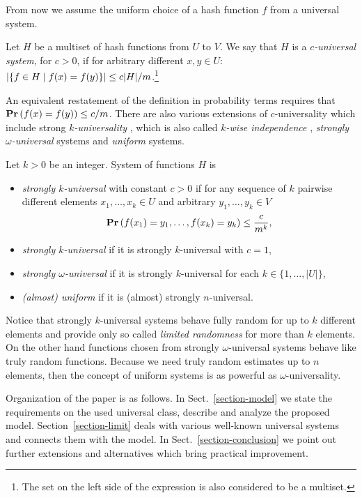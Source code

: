 From now we assume the uniform choice of a hash function $f$ from a universal system.

\begin{definition}
\label{definition-c-universal-system}
Let $H$ be a multiset of hash functions from $U$ to $V$. We say that $H$ is a \emph{$c$-universal system}, for $c > 0$, if for arbitrary different $x, y \in U$: $\left|\lbrace f \in H \mid f(x) = f(y) \rbrace\right| \leq {c|H|}/{m}$.\footnote{The set on the left side of the expression is also considered to be a multiset.}
\end{definition}

An equivalent restatement of the definition in probability terms requires that $\mathbf{Pr}\left(f(x) = f(y)\right) \leq c/m$. There are also various extensions of $c$-universality which include strong \emph{$k$-universality} \cite{DBLP:conf/focs/WegmanC79}, which is also called \emph{$k$-wise independence} \cite{DBLP:conf/focs/WegmanC79}, \emph{strongly $\omega$-universal} \cite{DBLP:conf/focs/WegmanC79} systems and \emph{uniform} \cite{DBLP:journals/siamcomp/PaghP08} systems.
\begin{definition}
Let $k > 0$ be an integer. System of functions $H$ is
\begin{itemize}
	\item \emph{strongly $k$-universal} with constant $c > 0$ if for any sequence of $k$ pairwise different elements $x_1, \dots, x_k \in U$ and arbitrary $y_1, \dots, y_k \in V$ \[\mathbf{Pr}\left(f(x_1) = y_1, \dots, f(x_k) = y_k\right) \leq \frac{c}{m^k}\mbox{,}\]
	\item \emph{strongly $k$-universal} if it is strongly $k$-universal with $c = 1$,
	\item \emph{strongly $\omega$-universal} if it is strongly $k$-universal for each $k \in \{1, \dots, |U|\}$,
	\item \emph{(almost) uniform} if it is (almost) strongly $n$-universal.
\end{itemize}
\end{definition}

Notice that strongly $k$-universal systems behave fully random for up to $k$ different elements and provide only so called \emph{limited randomness} for more than $k$ elements. On the other hand functions chosen from strongly $\omega$-universal systems behave like truly random functions. Because we need truly random estimates up to $n$ elements, then the concept of uniform systems is as powerful as $\omega$-universality.

Organization of the paper is as follows. In Sect.~\ref{section-model} we state the requirements on the used universal class, describe and analyze the proposed model. Section~\ref{section-limit} deals with various well-known universal systems and connects them with the model. In Sect.~\ref{section-conclusion} we point out further extensions and alternatives which bring practical improvement.
